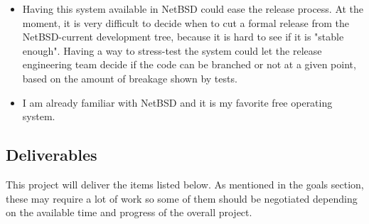 \documentclass[a4paper,10pt]{article}
\begin{document}
\begin{itemize}
\item Having this system available in NetBSD could ease the release
process.  At the moment, it is very difficult to decide when to cut a
formal release from the NetBSD-current development tree, because it is hard
to see if it is "stable enough".  Having a way to stress-test the system
could let the release engineering team decide if the code can be branched
or not at a given point, based on the amount of breakage shown by tests.

\item I am already familiar with NetBSD and it is my favorite free
operating system.

\end{itemize}


\subsection{Deliverables}

This project will deliver the items listed below.  As mentioned in the
goals section, these may require a lot of work so some of them should be
negotiated depending on the available time and progress of the overall
project.
\end{document}
